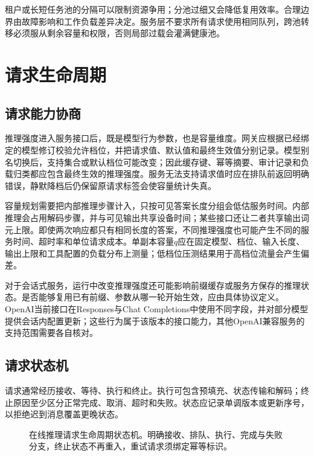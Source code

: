 \documentclass[../textbook.tex]{subfiles}
\begin{document}
租户或长短任务池的分隔可以限制资源争用；分池过细又会降低复用效率。合理边界由故障影响和工作负载差异决定。服务层不要求所有请求使用相同队列，跨池转移必须服从剩余容量和权限，否则局部过载会灌满健康池。

\section{请求生命周期}

\subsection{请求能力协商}
推理强度进入服务接口后，既是模型行为参数，也是容量维度。网关应根据已经绑定的模型修订校验允许档位，并把请求值、默认值和最终生效值分别记录。模型别名切换后，支持集合或默认档位可能改变；因此缓存键、幂等摘要、审计记录和负载归类都应包含最终生效的推理强度。服务无法支持请求值时应在排队前返回明确错误，静默降档后仍保留原请求标签会使容量统计失真。

容量规划需要把内部推理步骤计入，只按可见答案长度分组会低估服务时间。内部推理会占用解码步骤，并与可见输出共享设备时间；某些接口还让二者共享输出词元上限。即使两次响应都只有相同长度的答案，不同推理强度也可能产生不同的服务时间、超时率和单位请求成本。单副本容量$q$应在固定模型、档位、输入长度、输出上限和工具配置的负载分布上测量；低档位压测结果用于高档位流量会产生偏差。

对于会话式服务，运行中改变推理强度还可能影响前缀缓存或服务方保存的推理状态。是否能够复用已有前缀、参数从哪一轮开始生效，应由具体协议定义。OpenAI当前接口在Responses与Chat Completions中使用不同字段，并对部分模型提供会话内配置更新；这些行为属于该版本的接口能力，其他OpenAI兼容服务的支持范围需要各自核对\cite{openai2026modelguidance}。

\subsection{请求状态机}
请求通常经历接收、等待、执行和终止。执行可包含预填充、状态传输和解码；终止原因至少区分正常完成、取消、超时和失败。状态应记录单调版本或更新序号，以拒绝迟到消息覆盖更晚状态。

\begin{figure}[htbp]
\centering
{}
\caption[在线推理请求生命周期状态机]{在线推理请求生命周期状态机。明确接收、排队、执行、完成与失败分支，终止状态不再重入，重试请求须绑定幂等标识。}\label{fig:serving-request}
\end{figure}
\end{document}
